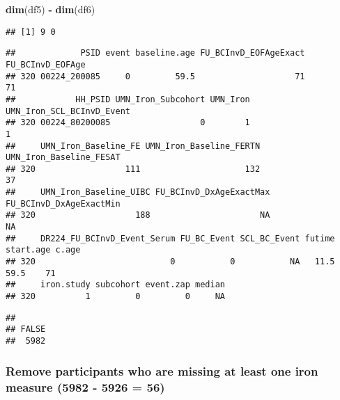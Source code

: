 \documentclass[
]{article}
\newenvironment{Shaded}{\begin{snugshade}}{\end{snugshade}}
\newcommand{\KeywordTok}[1]{\textcolor[rgb]{0.13,0.29,0.53}{\textbf{#1}}}
\newcommand{\NormalTok}[1]{#1}
\newcommand{\OperatorTok}[1]{\textcolor[rgb]{0.81,0.36,0.00}{\textbf{#1}}}
\newcommand{\StringTok}[1]{\textcolor[rgb]{0.31,0.60,0.02}{#1}}
\begin{document}
\begin{Shaded}
\begin{Highlighting}[]
\KeywordTok{dim}\NormalTok{(df5) }\OperatorTok{-}\StringTok{ }\KeywordTok{dim}\NormalTok{(df6)}
\end{Highlighting}
\end{Shaded}

\begin{verbatim}
## [1] 9 0
\end{verbatim}

\begin{Shaded}
\end{Shaded}

\begin{verbatim}
##             PSID event baseline.age FU_BCInvD_EOFAgeExact FU_BCInvD_EOFAge
## 320 00224_200085     0         59.5                    71               71
##            HH_PSID UMN_Iron_Subcohort UMN_Iron UMN_Iron_SCL_BCInvD_Event
## 320 00224_80200085                  0        1                         1
##     UMN_Iron_Baseline_FE UMN_Iron_Baseline_FERTN UMN_Iron_Baseline_FESAT
## 320                  111                     132                      37
##     UMN_Iron_Baseline_UIBC FU_BCInvD_DxAgeExactMax FU_BCInvD_DxAgeExactMin
## 320                    188                      NA                      NA
##     DR224_FU_BCInvD_Event_Serum FU_BC_Event SCL_BC_Event futime start.age c.age
## 320                           0           0           NA   11.5      59.5    71
##     iron.study subcohort event.zap median
## 320          1         0         0     NA
\end{verbatim}

\begin{Shaded}
\end{Shaded}

\begin{verbatim}
## 
## FALSE 
##  5982
\end{verbatim}

\hypertarget{remove-participants-who-are-missing-at-least-one-iron-measure-5982---5926-56}{%
\subsubsection{Remove participants who are missing at least one iron
measure (5982 - 5926 =
56)}\label{remove-participants-who-are-missing-at-least-one-iron-measure-5982---5926-56}}
\end{document}
